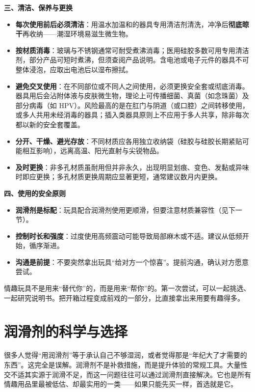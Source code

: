 \documentclass[12pt,UTF8]{ctexbook}
\begin{document}
\textbf{三、清洁、保养与更换}

\begin{itemize}
\item \textbf{每次使用前后必须清洁}：用温水加温和的器具专用清洁剂清洗，冲净后\textbf{彻底晾干}再收纳——潮湿环境易滋生微生物。
\item \textbf{按材质消毒}：玻璃与不锈钢通常可耐受煮沸消毒；医用硅胶多数可用专用清洁剂，部分产品可短时煮沸，但须查阅产品说明。含电池或电子元件的器具不可整体浸泡，应取出电池后以湿布擦拭。
\item \textbf{避免交叉使用}：在不同部位或不同人之间使用，必须更换安全套或彻底消毒。器具用后会沾附体液与皮肤微生物，理论上可传播细菌、真菌（如念珠菌）及部分病毒（如 HPV）。风险最高的是在肛门与阴道（或口腔）之间转移使用，或多人共用未经消毒的器具；插入类器具原则上不应用于多人共享，除非每次都以新的安全套覆盖。
\item \textbf{分开、干燥、避光存放}：不同材质应各用独立收纳袋（硅胶与硅胶长期紧贴可能相互影响），远离高温、阳光直射与尖锐物品。
\item \textbf{及时更换}：非多孔材质虽耐用但并非永久，出现明显划痕、变色、发黏或异味时即应更换；多孔材质更换周期应显著更短，通常建议数月内更换。
\end{itemize}

\textbf{四、使用的安全原则}

\begin{itemize}
\item \textbf{润滑剂是标配}：玩具配合润滑剂使用更顺滑，但要注意材质兼容性（见下一节）。
\item \textbf{控制时长和强度}：过度使用高频震动可能导致局部麻木或不适。建议从低频开始，循序渐进。
\item \textbf{沟通是前提}：不要突然拿出玩具“给对方一个惊喜”。提前沟通，确认对方愿意尝试。
\end{itemize}

\begin{tcolorbox}[colback=pink!5!white,colframe=red!50!black,title=贴心小叮咛]
情趣玩具不是用来“替代你”的，而是用来“帮你”的。第一次尝试，可以一起挑选、一起研究说明书。把开箱过程变成前戏的一部分，比直接拿出来用要有趣得多。
\end{tcolorbox}

\section{润滑剂的科学与选择}

很多人觉得“用润滑剂”等于承认自己不够湿润，或者觉得那是“年纪大了才需要的东西”。这完全是误解。润滑剂不是补救措施，而是提升体验的常规工具。大量性交不适其实源于润滑不足，而这一问题往往可以通过润滑剂直接解决。它也是所有情趣用品里最被低估、却最实用的一类——如果只能先买一样，首选就是它。
\end{document}

